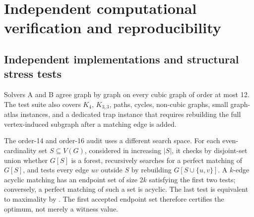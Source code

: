 \documentclass[smallextended,natbib,nospthms]{svjour3}
\theoremstyle{definition}
\theoremstyle{remark}
\begin{document}
\begin{table}[t]
\centering
\caption{Paired full-census comparison. Times are medians of whole-layer
repetitions. Speedup is $T_B/T_C$, and reduction compares complete candidates.}
\label{tab:solverc-bench}
\scriptsize
{}
\end{table}

\section{Independent computational verification and reproducibility}
\label{sec:verification}

\subsection{Independent implementations and structural stress tests}

Solvers A and B agree graph by graph on every cubic graph of order at most 12.
The test suite also covers $K_4$, $K_{3,3}$, paths, cycles, non-cubic graphs,
small graph-atlas instances, and a dedicated trap instance that requires
rebuilding the full vertex-induced subgraph after a matching edge is added.

The order-14 and order-16 audit uses a different search space. For each
even-cardinality set $S\subseteq V(G)$, considered in increasing $|S|$, it
checks by disjoint-set union whether $G[S]$ is a forest, recursively searches
for a perfect matching of $G[S]$, and tests every edge $uv$ outside $S$ by
rebuilding $G[S\cup\{u,v\}]$. A $k$-edge acyclic matching has an endpoint set
of size $2k$ satisfying the first two tests; conversely, a perfect matching of
such a set is acyclic. The last test is equivalent to maximality by
. The first accepted endpoint set therefore certifies the
optimum, not merely a witness value.
\end{document}
